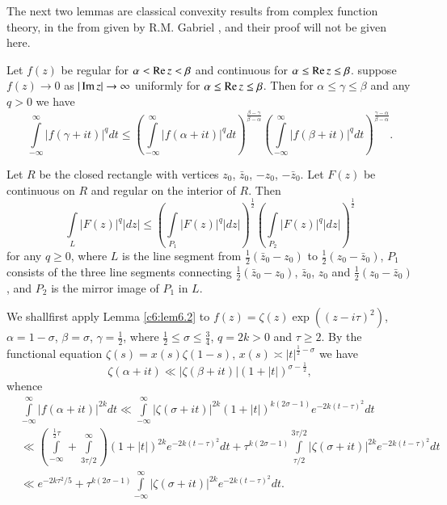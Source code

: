 The next two lemmas are classical convexity results from complex
function theory, in the from given by R.M. Gabriel \cite{Gabriel1},
and their proof will not be given here. 

\begin{lemma}\label{c6:lem6.2}
Let $f(z)$ be regular for $\alpha < \operatorname{Re} z < \beta$ and continuous for
$\alpha \leq \operatorname{Re} z \leq\beta$. suppose $f(z) \to 0$ as $|\operatorname{Im} z| \to
\infty$ uniformly for $\alpha \leq \operatorname{Re} z \leq \beta$. Then for $\alpha
\leq \gamma \leq \beta$ and any $q >0$ we have 
\begin{equation}
\int\limits^\infty_{-\infty} |f(\gamma + it)|^q dt \leq
\left(\int\limits^{\infty}_{-\infty} |f(\alpha + it)|^q dt
\right)^{\frac{\beta-\gamma}{\beta-\alpha}}
\left(\int\limits^\infty_{-\infty} |f(\beta + it)|^q dt
\right)^{\frac{\gamma-\alpha}{\beta-\alpha}}. 
\label{c6:eq6.11}
\end{equation}
\end{lemma}

\begin{lemma}\label{c6:lem6.3}
Let $R$ be the closed rectangle with vertices $z_0$, $\bar{z}_0$,
$-z_0$, $-\bar{z}_0$. Let $F(z)$ be continuous on $R$ and regular on
the interior of $R$. Then 
\begin{equation}
\int\limits_L |F(z)|^q |dz| \leq \left( \int\limits_{P_1} |F(z)|^q
|dz|\right)^{\frac{1}{2}} \left(\int\limits_{P_2} |F(z)|^q |dz|
\right)^{\frac{1}{2}} \label{c6:eq6.12}
\end{equation}
for any $q \geq 0$, where $L$ is the line segment from $\frac{1}{2}
(\bar{z}_0 - z_0)$ to $\frac{1}{2} (z_0 -\bar{z}_0)$, $P_1$ consists
of the three line segments connecting $\frac{1}{2} (\bar{z}_0 - z_0)$,
$\bar{z}_0$, $z_0$ and $\frac{1}{2} (z_0- \bar{z}_0)$, and $P_2$ is
the mirror image of $P_1$ in $L$. 
\end{lemma}

We shall\pageoriginale first apply Lemma \ref{c6:lem6.2} to $f(z) =
\zeta (z) \exp((z-i\tau)^2)$, $\alpha = 1 - \sigma$, $\beta = \sigma$,
$\gamma = \frac{1}{2}$, where $\frac{1}{2} \leq \sigma \leq
\frac{3}{4}$, $q = 2k > 0$ and $\tau \geq 2$. By the functional
equation $\zeta(s) = x (s) \zeta(1-s)$, $x(s) \asymp |t|^{\frac{1}{2}
  - \sigma}$ we have  
$$
\zeta(\alpha + it) \ll |\zeta (\beta + it)| (1+|t|)^{\sigma
  -\frac{1}{2}}, 
$$
whence
{\fontsize{10pt}{12pt}\selectfont
\begin{align*}
& \int\limits^\infty_{-\infty} |f(\alpha + it)|^{2k} dt \ll
  \int\limits^{\infty}_{-\infty} |\zeta(\sigma + it)|^{2k}
  (1+|t|)^{k(2\sigma-1)} e^{-2k(t-\tau)^2} dt\\ 
& \ll \left(\int\limits^{\frac{1}{2} \tau}_{-\infty} +
  \int\limits^{\infty}_{3\tau/2} \right) (1+|t|)^{2k}
  e^{-2k(t-\tau)^2} dt +\tau^{k(2\sigma -1)} \int\limits^{3\tau
    /2}_{\tau/2} |\zeta(\sigma + it)|^{2k} e^{-2k(t-\tau)^2} dt\\ 
& \ll e^{-2k\tau^2/5} + \tau^{k(2\sigma-1)}
  \int\limits^\infty_{-\infty} |\zeta(\sigma+it)|^{2k}
  e^{-2k(t-\tau)^2} dt. 
\end{align*}}

